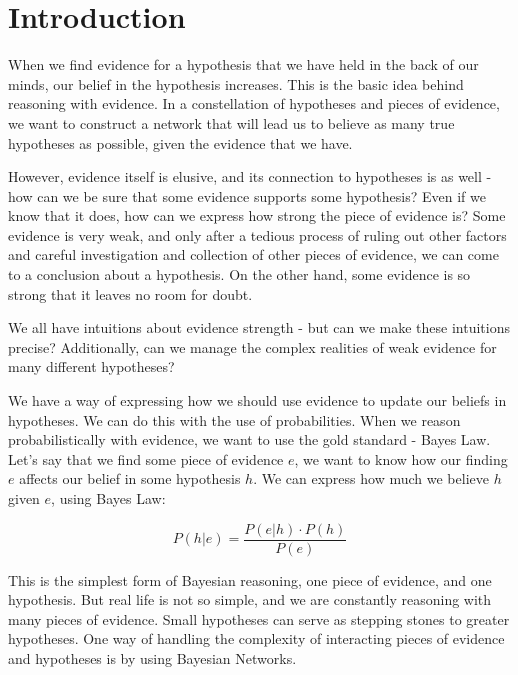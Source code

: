  

\chapter[Introduction]{Introduction}


When we find evidence for a hypothesis that we have held in the back of our minds, our belief in the hypothesis increases. This is the basic idea behind reasoning with evidence. In a constellation of hypotheses and pieces of evidence, we want to construct a network that will lead us to believe as many true hypotheses as possible, given the evidence that we have.

However, evidence itself is elusive, and its connection to hypotheses is as well - how can we be sure that some evidence supports some hypothesis? Even if we know that it does, how can we express how strong the piece of evidence is? Some evidence is very weak, and only after a tedious process of ruling out other factors and careful investigation and collection of other pieces of evidence, we can come to a conclusion about a hypothesis. On the other hand, some evidence is so strong that it leaves no room for doubt.

We all have intuitions about evidence strength - but can we make these intuitions precise? Additionally, can we manage the complex realities of weak evidence for many different hypotheses? 

We have a way of expressing how we should use evidence to update our beliefs in hypotheses. We can do this with the use of probabilities. When we reason probabilistically with evidence, we want to use the gold standard - Bayes Law.
Let's say that we find some piece of evidence $e$, we want to know how our finding $e$ affects our belief in some hypothesis $h$. We can express how much we believe $h$ given $e$, using Bayes Law:

\[ P(h | e) =  \frac{P(e | h) \cdot P(h)}{P(e)}\]


This is the simplest form of Bayesian reasoning, one piece of evidence, and one hypothesis. But real life is not so simple, and we are constantly reasoning with many pieces of evidence. Small hypotheses can serve as stepping stones to greater hypotheses. One way of handling the complexity of interacting pieces of evidence and hypotheses is by using Bayesian Networks.


